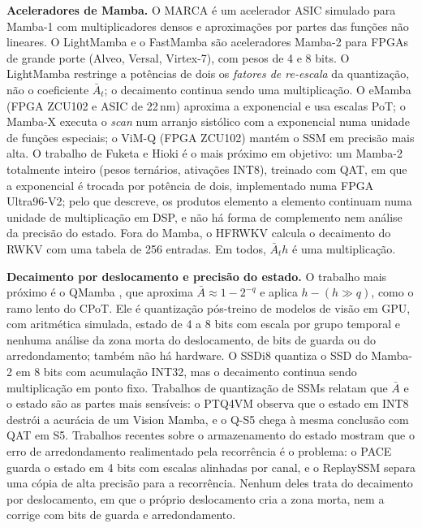 \documentclass[12pt]{article}
\begin{document}
\textbf{Aceleradores de Mamba.} O MARCA \cite{li2024marca} é um acelerador ASIC simulado para Mamba-1 com multiplicadores densos e aproximações por partes das funções não lineares. O LightMamba \cite{wei2025lightmamba} e o FastMamba \cite{fastmamba2025} são aceleradores Mamba-2 para FPGAs de grande porte (Alveo, Versal, Virtex-7), com pesos de 4 e 8 bits. O LightMamba restringe a potências de dois os \emph{fatores de re-escala} da quantização, não o coeficiente $\bar{A}_t$; o decaimento continua sendo uma multiplicação. O eMamba \cite{kim2025emamba} (FPGA ZCU102 e ASIC de 22\,nm) aproxima a exponencial e usa escalas PoT; o Mamba-X \cite{yoon2025mambax} executa o \emph{scan} num arranjo sistólico com a exponencial numa unidade de funções especiais; o ViM-Q \cite{lyu2026vimq} (FPGA ZCU102) mantém o SSM em precisão mais alta. O trabalho de Fuketa e Hioki \cite{fuketa2026fqmamba2} é o mais próximo em objetivo: um Mamba-2 totalmente inteiro (pesos ternários, ativações INT8), treinado com QAT, em que a exponencial é trocada por potência de dois, implementado numa FPGA Ultra96-V2; pelo que descreve, os produtos elemento a elemento continuam numa unidade de multiplicação em DSP, e não há forma de complemento nem análise da precisão do estado. Fora do Mamba, o HFRWKV \cite{liu2026hfrwkv} calcula o decaimento do RWKV com uma tabela de 256 entradas. Em todos, $\bar{A}_t h$ é uma multiplicação.

\textbf{Decaimento por deslocamento e precisão do estado.} O trabalho mais próximo é o QMamba \cite{li2025qmamba}, que aproxima $\bar{A} \approx 1 - 2^{-q}$ e aplica $h - (h \gg q)$, como o ramo lento do CPoT. Ele é quantização pós-treino de modelos de visão em GPU, com aritmética simulada, estado de 4 a 8 bits com escala por grupo temporal e nenhuma análise da zona morta do deslocamento, de bits de guarda ou do arredondamento; também não há hardware. O SSDi8 \cite{kim2026ssdi8} quantiza o SSD do Mamba-2 em 8 bits com acumulação INT32, mas o decaimento continua sendo multiplicação em ponto fixo. Trabalhos de quantização de SSMs relatam que $\bar{A}$ e o estado são as partes mais sensíveis: o PTQ4VM \cite{cho2025ptq4vm} observa que o estado em INT8 destrói a acurácia de um Vision Mamba, e o Q-S5 \cite{abreu2024qs5} chega à mesma conclusão com QAT em S5. Trabalhos recentes sobre o armazenamento do estado mostram que o erro de arredondamento realimentado pela recorrência é o problema: o PACE \cite{haller2026pace} guarda o estado em 4 bits com escalas alinhadas por canal, e o ReplaySSM \cite{liou2026replayssm} separa uma cópia de alta precisão para a recorrência. Nenhum deles trata do decaimento por deslocamento, em que o próprio deslocamento cria a zona morta, nem a corrige com bits de guarda e arredondamento.
\end{document}
